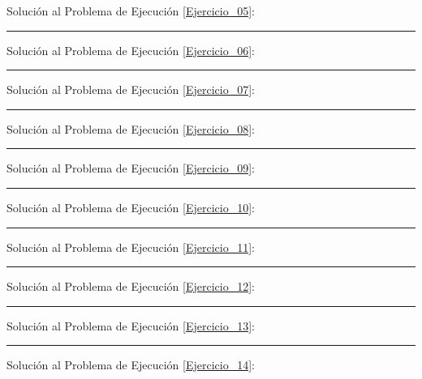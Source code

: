 \documentclass[12pt]{exam}
\begin{document}
Solución al Problema de Ejecución \ref{Ejercicio_05}:

\vspace*{4.5cm}
\rule{0.9\textwidth}{0.1mm}

Solución al Problema de Ejecución \ref{Ejercicio_06}:

\vspace*{4.5cm}
\rule{0.9\textwidth}{0.1mm}

Solución al Problema de Ejecución \ref{Ejercicio_07}:

\vspace*{4.5cm}
\rule{0.9\textwidth}{0.1mm}

Solución al Problema de Ejecución \ref{Ejercicio_08}:

\vspace*{4.5cm}
\rule{0.9\textwidth}{0.1mm}

Solución al Problema de Ejecución \ref{Ejercicio_09}:

\vspace*{4.5cm}
\rule{0.9\textwidth}{0.1mm}

Solución al Problema de Ejecución \ref{Ejercicio_10}:

\vspace*{4.5cm}
\rule{0.9\textwidth}{0.1mm}

Solución al Problema de Ejecución \ref{Ejercicio_11}:

\vspace*{4.5cm}
\rule{0.9\textwidth}{0.1mm}

Solución al Problema de Ejecución \ref{Ejercicio_12}:

\vspace*{4.5cm}
\rule{0.9\textwidth}{0.1mm}

Solución al Problema de Ejecución \ref{Ejercicio_13}:

\vspace*{4.5cm}
\rule{0.9\textwidth}{0.1mm}

Solución al Problema de Ejecución \ref{Ejercicio_14}:
\end{document}
